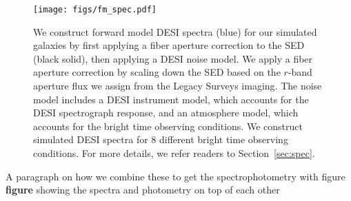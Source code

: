 \begin{figure}
\begin{center}
\texttt{[image: figs/fm\_spec.pdf]} 
\caption{We construct forward model DESI spectra (blue) for our simulated galaxies by first
applying a fiber aperture correction to the SED (black solid), then applying a DESI noise model. 
We apply a fiber aperture correction by scaling down the SED based on the $r$-band aperture
flux we assign from the Legacy Surveys imaging. The noise model includes a DESI instrument 
model, which accounts for the DESI spectrograph response, and an atmosphere model, which 
accounts for the bright time observing conditions. We construct simulated DESI spectra for 
8 different bright time observing conditions. For more details, we refer readers to Section~\ref{sec:spec}.
}
\label{fig:spec}
\end{center}
\end{figure}

A paragraph on how we combine these to get the spectrophotometry with figure 
{\bf figure} showing the spectra and photometry on top of each other 

